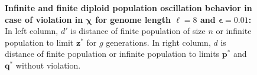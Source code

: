 \begin{figure}[h]
\begin{center}
\hspace{-3em}%
\vspace{-0.5em}  \hspace{-3em}%


\caption[\textbf{Infinite and finite diploid population oscillation behavior in case of violation in $\bm{\chi}$ for genome length $\ell = 8$ and $\bm{\epsilon} = 0.01$}]{\textbf{Infinite and finite diploid population oscillation behavior in case of violation in $\bm{\chi}$ for genome length $\ell = 8$ and $\bm{\epsilon} = 0.01$:} 
  In left column, $d'$ is distance of finite population of size $n$ or infinite population to limit $\bm{z}^\ast$ for $g$ generations. In right column, $d$ is distance of finite population or infinite population to limits $\bm{p}^\ast$ and $\bm{q}^\ast$ without violation.}
\label{oscillation_8d_vio_chi_0.01}
\end{center}
\end{figure}

